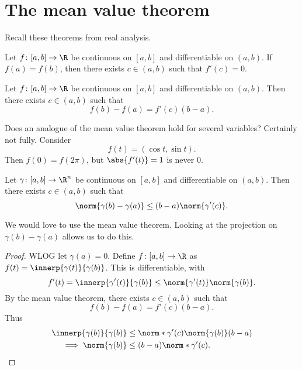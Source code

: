 \section{The mean value theorem} \label{sec:mvt}
Recall these theorems from real analysis.
\begin{theorem} \label{thm:rolle}
    Let $f\colon [a, b] \to \R$ be continuous on $[a, b]$
    and differentiable on $(a, b)$.
    If $f(a) = f(b)$,
    then there exists $c \in (a, b)$ such that $f'(c) = 0$.
\end{theorem}

\begin{theorem} \label{thm:mvt}
    Let $f\colon [a, b] \to \R$ be continuous on $[a, b]$
    and differentiable on $(a, b)$.
    Then there exists $c \in (a, b)$ such that \[
        f(b) - f(a) = f'(c)(b - a).
    \]
\end{theorem}

Does an analogue of the mean value theorem hold for several variables?
Certainly not fully.
Consider \[
    f(t) = (\cos t, \sin t).
\] Then $f(0) = f(2\pi)$, but $\abs{f'(t)} = 1$ is never $0$.

\begin{proposition} \label{thm:curve-mvt}
    Let $\gamma\colon [a, b] \to \R^n$ be continuous on $[a, b]$
    and differentiable on $(a, b)$.
    Then there exists $c \in (a, b)$ such that \[
        \norm{\gamma(b) - \gamma(a)} \le (b - a) \norm{\gamma'(c)}.
    \]
\end{proposition}
We would love to use the mean value theorem.
Looking at the projection on $\gamma(b) - \gamma(a)$ allows us to do this.
\begin{proof}
    WLOG let $\gamma(a) = 0$.
    Define $f\colon [a, b] \to \R$ as
    $f(t) = \innerp{\gamma(t)}{\gamma(b)}$.
    This is differentiable, with \[
        f'(t) = \innerp{\gamma'(t)}{\gamma(b)}
            \le \norm{\gamma'(t)} \norm{\gamma(b)}.
    \] By the mean value theorem, there exists $c \in (a, b)$ such that \[
        f(b) - f(a) = f'(c)(b - a).
    \] Thus \begin{align*}
        \innerp{\gamma(b)}{\gamma(b)}
            &\le \norm*{\gamma'(c)} \norm{\gamma(b)} (b - a) \\
        \implies \norm{\gamma(b)}
            &\le (b - a) \norm*{\gamma'(c)}. \qedhere
    \end{align*}
\end{proof}
